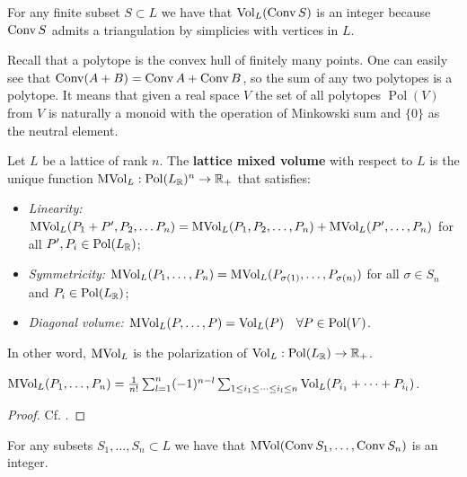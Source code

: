 \begin{remark}
    For any finite subset $S \subset L$ we have that $\operatorname{Vol}_L(\operatorname{Conv} S)$ is an integer because $\operatorname{Conv} S$ admits a triangulation by simplicies with vertices in $L$.
\end{remark}

\begin{remark}
    Recall that a polytope is the convex hull of finitely many points. One can easily see that $\operatorname{Conv} (A + B) = \operatorname{Conv} A + \operatorname{Conv} B$, so the sum of any two polytopes is a polytope. It means that given a real space $V$ the set of all polytopes $\operatorname{Pol}(V)$ from $V$ is naturally a monoid with the operation of Minkowski sum and $\{ 0 \}$ as the neutral element.
\end{remark}

\begin{definition}
    Let $L$ be a lattice of rank $n$. The \textbf{lattice mixed volume} with respect to $L$ is the unique function $\operatorname{MVol}_L: \operatorname{Pol}(L_{\mathbb R})^n \to \mathbb R_+$ that satisfies:
    \begin{itemize}
        \item \textit{Linearity:} $\operatorname{MVol}_L(P_1 + P', P_2, \dots P_n) = \operatorname{MVol}_L (P_1, P_2, \dots, P_n) + \operatorname{MVol}_L(P', \dots, P_n)$ for all $P', P_i \in \operatorname{Pol}(L_{\mathbb R})$;
        
        \item \textit{Symmetricity:} $\operatorname{MVol}_L(P_1, \dots, P_n) = \operatorname{MVol}_L(P_{\sigma(1)}, \dots, P_{\sigma(n)})$ for all $\sigma \in S_n$ and $P_i \in\operatorname{Pol}(L_{\mathbb R})$;

        \item \textit{Diagonal volume:} $\operatorname{MVol}_L(P, \dots, P) = \operatorname{Vol}_L (P) \quad \forall P \in \operatorname{Pol}(V)$.
    \end{itemize}
    In other word, $\operatorname{MVol}_L$ is the polarization of $\operatorname{Vol}_L: \operatorname{Pol}(L_{\mathbb R}) \to \mathbb R_+$.
\end{definition}

\begin{claim}
    $\operatorname{MVol}_L(P_1, \dots, P_n) = \frac{1}{n!} \sum_{l = 1}^n (-1)^{n - l} \sum_{1 \le i_1 \le \dots \le i_l \le n} \operatorname{Vol}_L (P_{i_1} + \dots + P_{i_l})$.
\end{claim}
\begin{proof}
    Cf. \cite[Thm 3.7, p.118]{Ewald1996}.
\end{proof}

\begin{remark}
    For any subsets $S_1, \dots, S_n \subset L$ we have that $\operatorname{MVol}(\operatorname{Conv} S_1, \dots, \operatorname{Conv} S_n)$ is an integer.
\end{remark}

